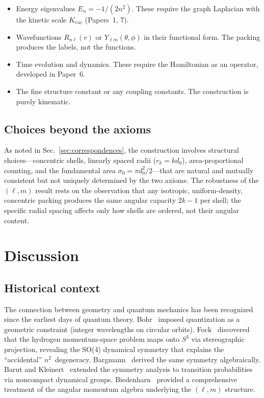 \documentclass[aps,prl,reprint,amsmath,amssymb]{revtex4-2}
\begin{document}
\begin{itemize}
\item[$\times$] Energy eigenvalues $E_n = -1/(2n^2)$.  These require
  the graph Laplacian with the kinetic scale $K_{\mathrm{vac}}$
  (Papers~1, 7).

\item[$\times$] Wavefunctions $R_{n\ell}(r)$ or
  $Y_{\ell m}(\theta, \phi)$ in their functional form.  The packing
  produces the labels, not the functions.

\item[$\times$] Time evolution and dynamics.  These require the
  Hamiltonian as an operator, developed in Paper~6.

\item[$\times$] The fine structure constant or any coupling constants.
  The construction is purely kinematic.
\end{itemize}

\subsection{Choices beyond the axioms}

As noted in Sec.~\ref{sec:correspondences}, the construction involves
structural choices---concentric shells, linearly spaced radii
($r_k = k d_0$), area-proportional counting, and the fundamental area
$\sigma_0 = \pi d_0^2 / 2$---that are natural and mutually consistent
but not uniquely determined by the two axioms.  The robustness of the
$(\ell, m)$ result rests on the observation that any isotropic,
uniform-density, concentric packing produces the same angular capacity
$2k - 1$ per shell; the specific radial spacing affects only how
shells are ordered, not their angular content.


\section{Discussion}
\label{sec:discussion}

\subsection{Historical context}

The connection between geometry and quantum mechanics has been
recognized since the earliest days of quantum theory.
Bohr~\cite{bohr1913} imposed quantization as a geometric constraint
(integer wavelengths on circular orbits).
Fock~\cite{fock1935} discovered that the hydrogen momentum-space
problem maps onto $S^3$ via stereographic projection, revealing the
SO(4) dynamical symmetry that explains the ``accidental''
$n^2$~degeneracy.  Bargmann~\cite{bargmann1936} derived the same
symmetry algebraically.  Barut and Kleinert~\cite{barut1967}
extended the symmetry analysis to transition probabilities via
noncompact dynamical groups.  Biedenharn~\cite{biedenharn1981}
provided a comprehensive treatment of the angular momentum algebra
underlying the $(\ell, m)$ structure.
\end{document}
